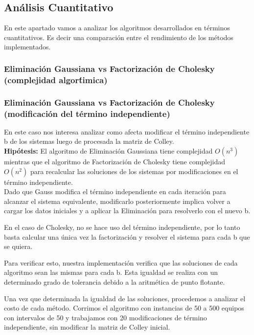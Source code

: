 \subsection{An\'alisis Cuantitativo}
En este apartado vamos a analizar los algoritmos desarrollados en t\'erminos cuantitativos. Es decir una comparaci\'on entre el rendimiento de los m\'etodos implementados.

\subsubsection{Eliminaci\'on Gaussiana vs Factorizaci\'on de Cholesky (complejidad algor\'timica)}

\subsubsection{Eliminaci\'on Gaussiana vs Factorizaci\'on de Cholesky (modificaci\'on del t\'ermino independiente)}
En este caso nos interesa analizar como afecta modificar el t\'ermino independiente b de los sistemas luego de procesada la matriz de Colley. \\

\textbf{Hip\'otesis:} El algoritmo de Eliminaci\'on Gaussiana tiene complejidad $O(n^{3})$ mientras que el algoritmo de Factorizaci\'on de Cholesky tiene complejidad $O(n^{2})$ para recalcular las soluciones de los sistemas por modificaciones en el t\'ermino independiente. \\

Dado que Gauss modifica el t\'ermino independiente en cada iteraci\'on para alcanzar el sistema equivalente, modificarlo posteriormente implica volver a cargar los datos iniciales y a aplicar la Eliminaci\'on para resolverlo con el nuevo b.

En el caso de Cholesky, no se hace uso del t\'ermino independiente, por lo tanto basta calcular una \'unica vez la factorizaci\'on y resolver el sistema para cada b que se quiera.

Para verificar esto, nuestra implementaci\'on verifica que las soluciones de cada algoritmo sean las mismas para cada b. Esta igualdad se realiza con un determinado grado de tolerancia debido a la aritm\'etica de punto flotante.

Una vez que determinada la igualdad de las soluciones, procedemos a analizar el costo de cada m\'etodo. Corrimos el algoritmo con instancias de 50 a 500 equipos con intervalos de 50 y trabajamos con 20 modificaciones de t\'ermino independiente, sin modificar la matriz de Colley inicial.

